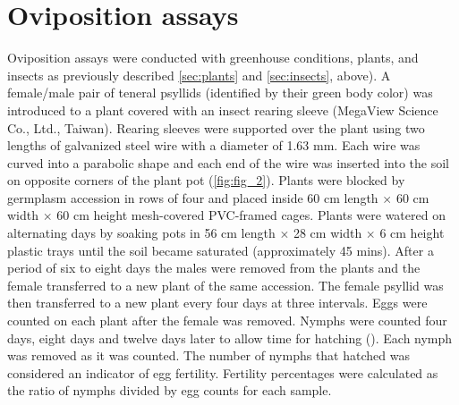 \documentclass{UIdahoMastersThesis}
\begin{document}
\section{Oviposition assays}
\label{sec:fecundity}
Oviposition assays were conducted with greenhouse conditions, plants, and insects as previously described \autoref{sec:plants} and \autoref{sec:insects}, above). A female/male pair of teneral psyllids (identified by their green body color) was introduced to a plant covered with an insect rearing sleeve (MegaView Science Co., Ltd., Taiwan). Rearing sleeves were supported over the plant using two lengths of galvanized steel wire with a diameter of 1.63 mm. Each wire was curved into a parabolic shape and each end of the wire was inserted into the soil on opposite corners of the plant pot (\autoref{fig:fig_2}). 
Plants were blocked by germplasm accession in rows of four and placed inside 60 cm length $\times$ 60 cm width $\times$ 60 cm height mesh-covered PVC-framed cages. Plants were watered on alternating days by soaking pots in 56 cm length $\times$ 28 cm width $\times$ 6 cm height plastic trays until the soil became saturated (approximately 45 mins). 
After a period of six to eight days the males were removed from the plants and the female transferred to a new plant of the same accession. The female psyllid was then transferred to a new plant every four days at three intervals. Eggs were counted on each plant after the female was removed. Nymphs were counted four days, eight days and twelve days later to allow time for hatching (\cite{Knowlton1931}). Each nymph was removed as it was counted. The number of nymphs that hatched was considered an indicator of egg fertility. Fertility percentages were calculated as the ratio of nymphs divided by egg counts for each sample.
\end{document}
